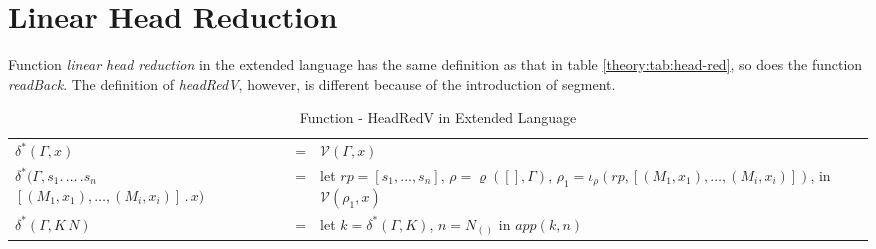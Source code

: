 \section{Linear Head Reduction}
Function \emph{linear head reduction} in the extended language has the same definition as that in table \ref{theory:tab:head-red}, so does the function \emph{readBack}. The definition of \emph{headRedV}, however, is different because of the introduction of segment.
\begin{table}[h]
  \centering
  \begin{tabular}{p{5cm} l p{8cm}}
    $\delta^*(\Gamma, x)$ & = & $\mathcal{V}(\Gamma, x)$ \\
    $\delta^*(\Gamma, s_1.\,\dots\,.s_n$ \newline $[(M_1,x_1),\dots,(M_i,x_i)]\,.\,x)$ & = & let $rp = [s_1,\dots,s_n]$, $\rho = \varrho([], \Gamma)$, \newline $\rho_1 = \iota_\rho(rp, [(M_1,x_1),\dots,(M_i,x_i)])$, \newline in $\mathcal{V}(\rho_1, x)$ \\
    $\delta^*(\Gamma, K\,N)$ & = & let $k = \delta^*(\Gamma, K)$, $n = N_{()}$ in $app(k,n)$ \\
  \end{tabular}
  \caption{Function - HeadRedV in Extended Language}
  \label{extension:tab:headRedV}
\end{table}

